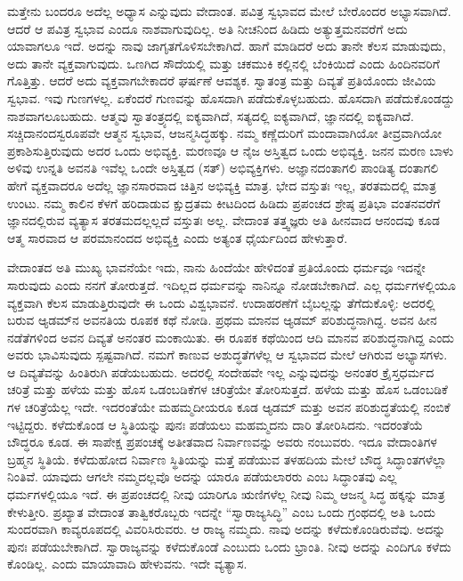 ಮತ್ತೇನು ಬಂದರೂ ಅದೆಲ್ಲ ಅಧ್ಯಾಸ ಎನ್ನುವುದು ವೇದಾಂತ. ಪವಿತ್ರ ಸ್ವಭಾವದ ಮೇಲೆ ಬೇರೊಂದರ ಅಭ್ಯಾಸವಾಗಿದೆ. ಆದರೆ ಆ ಪವಿತ್ರ ಸ್ವಭಾವ ಎಂದೂ ನಾಶವಾಗುವುದಿಲ್ಲ. ಅತಿ ನೀಚನಿಂದ ಹಿಡಿದು ಅತ್ಯುತ್ತಮನವರೆಗೆ ಅದು ಯಾವಾಗಲೂ ಇದೆ. ಅದನ್ನು ನಾವು ಜಾಗೃತಗೊಳಿಸಬೇಕಾಗಿದೆ. ಹಾಗೆ ಮಾಡಿದರೆ ಅದು ತಾನೇ ಕೆಲಸ ಮಾಡುವುದು, ಅದು ತಾನೇ ವ್ಯಕ್ತವಾಗುವುದು. ಒಣಗಿದ ಸೌದೆಯಲ್ಲಿ ಮತ್ತು ಚಕಮುಕಿ ಕಲ್ಲಿನಲ್ಲಿ ಬೆಂಕಿಯಿದೆ ಎಂದು ಹಿಂದಿನವರಿಗೆ ಗೊತ್ತಿತ್ತು. ಆದರೆ ಅದು ವ್ಯಕ್ತವಾಗಬೇಕಾದರೆ ಘರ್ಷಣೆ ಆವಶ್ಯಕ. ಸ್ವಾತಂತ್ರ ಮತ್ತು ದಿವ್ಯತೆ ಪ್ರತಿಯೊಂದು ಜೀವಿಯ ಸ್ವಭಾವ. ಇವು ಗುಣಗಳಲ್ಲ. ಏಕೆಂದರೆ ಗುಣವನ್ನು ಹೊಸದಾಗಿ ಪಡೆದುಕೊಳ್ಳಬಹುದು. ಹೊಸದಾಗಿ ಪಡೆದುಕೊಂಡದ್ದು ನಾಶವಾಗಲೂಬಹುದು. ಆತ್ಮವು ಸ್ವಾತಂತ್ರ್ಯದಲ್ಲಿ ಐಕ್ಯವಾಗಿದೆ, ಸತ್ಯದಲ್ಲಿ ಐಕ್ಯವಾಗಿದೆ, ಜ್ಞಾನದಲ್ಲಿ ಐಕ್ಯವಾಗಿದೆ. ಸಚ್ಚಿದಾನಂದಸ್ವರೂಪವೇ ಆತ್ಮನ ಸ್ವಭಾವ, ಆಜನ್ಮಸಿದ್ಧಹಕ್ಕು. ನಮ್ಮ ಕಣ್ಣೆದುರಿಗೆ ಮಂದಾವಾಗಿಯೋ ತೀವ್ರವಾಗಿಯೋ ಪ್ರಕಾಶಿಸುತ್ತಿರುವುದು ಅದರ ಒಂದು ಅಭಿವ್ಯಕ್ತಿ. ಮರಣವೂ ಆ ನೈಜ ಅಸ್ತಿತ್ವದ ಒಂದು ಅಭಿವ್ಯಕ್ತಿ. ಜನನ ಮರಣ ಬಾಳು ಅಳಿವು ಉನ್ನತಿ ಅವನತಿ ಇವೆಲ್ಲ ಒಂದೇ ಅಸ್ತಿತ್ವದ (ಸತ್​) ಅಭಿವ್ಯಕ್ತಿಗಳು. ಅಜ್ಞಾನದಂತಾಗಲಿ ಪಾಂಡಿತ್ಯ ದಂತಾಗಲಿ ಹೇಗೆ ವ್ಯಕ್ತವಾದರೂ ಅದೆಲ್ಲ ಜ್ಞಾನಸಾರವಾದ ಚಿತ್ತಿನ ಅಭಿವ್ಯಕ್ತಿ ಮಾತ್ರ. ಭೇದ ವಸ್ತುತಃ ಇಲ್ಲ, ತರತಮದಲ್ಲಿ ಮಾತ್ರ ಉಂಟು. ನಮ್ಮ ಕಾಲಿನ ಕೆಳಗೆ ಹರಿದಾಡುವ ಕ್ಷುದ್ರತಮ ಕೀಟದಿಂದ ಹಿಡಿದು ಪ್ರಪಂಚದ ಶ್ರೇಷ್ಠ ಪ್ರತಿಭಾ ವಂತನವರೆಗೆ ಜ್ಞಾನದಲ್ಲಿರುವ ವ್ಯತ್ಯಾಸ ತರತಮದಲ್ಲಲ್ಲದೆ ವಸ್ತುತಃ ಅಲ್ಲ. ವೇದಾಂತ ತತ್ತ್ವಜ್ಞರು ಅತಿ ಹೀನವಾದ ಆನಂದವು ಕೂಡ ಆತ್ಮ ಸಾರವಾದ ಆ ಪರಮಾನಂದದ ಅಭಿವ್ಯಕ್ತಿ ಎಂದು ಅತ್ಯಂತ ಧೈರ್ಯದಿಂದ ಹೇಳುತ್ತಾರೆ.

ವೇದಾಂತದ ಅತಿ ಮುಖ್ಯ ಭಾವನೆಯೇ ಇದು, ನಾನು ಹಿಂದೆಯೇ ಹೇಳಿದಂತೆ ಪ್ರತಿಯೊಂದು ಧರ್ಮವೂ ಇದನ್ನೇ ಸಾರುವುದು ಎಂದು ನನಗೆ ತೋರುತ್ತದೆ. ಇದಿಲ್ಲದ ಧರ್ಮವನ್ನು ನಾನಿನ್ನೂ ನೋಡಬೇಕಾಗಿದೆ. ಎಲ್ಲ ಧರ್ಮಗಳಲ್ಲಿಯೂ ವ್ಯಕ್ತವಾಗಿ ಕೆಲಸ ಮಾಡುತ್ತಿರುವುದೇ ಈ ಒಂದು ವಿಶ್ವಭಾವನೆ. ಉದಾಹರಣೆಗೆ ಬೈಬಲ್ಲನ್ನು ತೆಗೆದುಕೊಳ್ಳಿ: ಅದರಲ್ಲಿ ಬರುವ ಆ್ಯಡಮ್​ನ ಅವನತಿಯ ರೂಪಕ ಕಥೆ ನೋಡಿ. ಪ್ರಥಮ ಮಾನವ ಆ್ಯಡಮ್​ ಪರಿಶುದ್ಧನಾಗಿದ್ದ. ಅವನ ಹೀನ ನಡೆತೆಗಳಿಂದ ಅವನ ದಿವ್ಯತೆ ಅನಂತರ ಮಂಕಾಯಿತು. ಈ ರೂಪಕ ಕಥೆಯಿಂದ ಆದಿ ಮಾನವ ಪರಿಶುದ್ಧನಾಗಿದ್ದ ಎಂದು ಅವರು ಭಾವಿಸುವುದು ಸ್ಪಷ್ಟವಾಗಿದೆ. ನಮಗೆ ಕಾಣುವ ಅಶುದ್ಧತೆಗಳೆಲ್ಲ ಆ ಸ್ವಭಾವದ ಮೇಲೆ ಆಗಿರುವ ಅಭ್ಯಾಸಗಳು. ಆ ದಿವ್ಯತೆವನ್ನು ಹಿಂತಿರುಗಿ ಪಡೆಯಬಹುದು. ಅದರಲ್ಲಿ ಸಂದೇಹವೇ ಇಲ್ಲ ಎನ್ನುವುದನ್ನು ಅನಂತರ ಕ್ರೈಸ್ತಧರ್ಮದ ಚರಿತ್ರೆ ಮತ್ತು ಹಳೆಯ ಮತ್ತು ಹೊಸ ಒಡಂಬಡಿಕೆಗಳ ಚರಿತ್ರೆಯೇ ತೋರಿಸುತ್ತದೆ. ಹಳೆಯ ಮತ್ತು ಹೊಸ ಒಡಂಬಡಿಕೆ ಗಳ ಚರಿತ್ರೆಯೆಲ್ಲ ಇದೇ. ಇದರಂತೆಯೇ ಮಹಮ್ಮದೀಯರೂ ಕೂಡ ಆ್ಯಡಮ್​ ಮತ್ತು ಅವನ ಪರಿಶುದ್ಧತೆಯಲ್ಲಿ ನಂಬಿಕೆ ಇಟ್ಟಿದ್ದರು. ಕಳೆದುಕೊಂಡ ಆ ಸ್ಥಿತಿಯನ್ನು ಪುನಃ ಪಡೆಯಲು ಮಹಮ್ಮದನು ದಾರಿ ತೋರಿಸಿದನು. ಇದರಂತೆಯೆ ಬೌದ್ಧರೂ ಕೂಡ. ಈ ಸಾಪೇಕ್ಷ ಪ್ರಪಂಚಕ್ಕೆ ಅತೀತವಾದ ನಿರ್ವಾಣವನ್ನು ಅವರು ನಂಬುವರು. ಇದೂ ವೇದಾಂತಿಗಳ ಬ್ರಹ್ಮನ ಸ್ಥಿತಿಯೆ. ಕಳೆದುಹೋದ ನಿರ್ವಾಣ ಸ್ಥಿತಿಯನ್ನು ಮತ್ತೆ ಪಡೆಯುವ ತಳಹದಿಯ ಮೇಲೆ ಬೌದ್ಧ ಸಿದ್ಧಾಂತಗಳೆಲ್ಲಾ ನಿಂತಿವೆ. ಯಾವುದು ಆಗಲೇ ನಮ್ಮದಲ್ಲವೊ ಅದನ್ನು ಯಾರೂ ಪಡೆಯಲಾರರು ಎಂಬ ಸಿದ್ಧಾಂತವು ಎಲ್ಲ ಧರ್ಮಗಳಲ್ಲಿಯೂ ಇದೆ. ಈ ಪ್ರಪಂಚದಲ್ಲಿ ನೀವು ಯಾರಿಗೂ ಋಣಿಗಳೆಲ್ಲ ನೀವು ನಿಮ್ಮ ಆಜನ್ಮ ಸಿದ್ಧ ಹಕ್ಕನ್ನು ಮಾತ್ರ ಕೇಳುತ್ತೀರಿ. ಪ್ರಖ್ಯಾತ ವೇದಾಂತ ತಾತ್ವಿಕರೊಬ್ಬರು ಇದನ್ನೇ “ಸ್ವಾರಾಜ್ಯಸಿದ್ಧಿ” ಎಂಬ ಒಂದು ಗ್ರಂಥದಲ್ಲಿ ಅತಿ ಒಂದು ಸುಂದರವಾಗಿ ಕಾವ್ಯರೂಪದಲ್ಲಿ ವಿವರಿಸಿರುವರು. ಆ ರಾಜ್ಯ ನಮ್ಮದು. ನಾವು ಅದನ್ನು ಕಳೆದುಕೊಂಡಿರುವೆವು. ಅದನ್ನು ಪುನಃ ಪಡೆಯಬೇಕಾಗಿದೆ. ಸ್ವಾರಾಜ್ಯವನ್ನು ಕಳೆದುಕೊಂಡೆ ಎಂಬುದು ಒಂದು ಭ್ರಾಂತಿ. ನೀವು ಅದನ್ನು ಎಂದಿಗೂ ಕಳೆದು ಕೊಂಡಿಲ್ಲ. ಎಂದು ಮಾಯಾವಾದಿ ಹೇಳುವನು. ಇದೇ ವ್ಯತ್ಯಾಸ.

